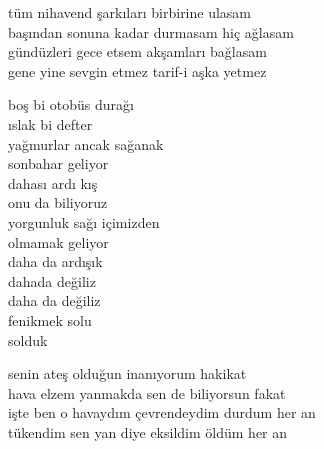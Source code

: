 \documentclass[10pt, openright, oneside]{memoir}
\theoremstyle{definition}
\begin{document}
\vspace*{\fill}
%
\newpage
{}
\vspace*{\fill}
\settowidth{\versewidth}{başından sonuna kadar durmasam hiç ağlasam}
\begin{cverse}
  tüm nihavend şarkıları birbirine ulasam \\
  başından sonuna kadar durmasam hiç ağlasam \\
  gündüzleri gece etsem akşamları bağlasam \\
  gene yine sevgin etmez tarif-i aşka yetmez \\
\end{cverse}
\vspace*{\fill}
%
\newpage
{}
\vspace*{\fill}
\settowidth{\versewidth}{yorgunluk sağı içimizden}
\begin{cverse}
  boş bi otobüs durağı \\
  ıslak bi defter \\
  yağmurlar ancak sağanak \\
  sonbahar geliyor \\
  dahası ardı kış \\
  onu da biliyoruz \\
  yorgunluk sağı içimizden \\
  olmamak geliyor \\
  daha da ardışık \\
  dahada değiliz \\
  daha da değiliz \\
  fenikmek solu \\
  solduk \\
\end{cverse}
\vspace*{\fill}
%
\newpage
{}
\vspace*{\fill}
\settowidth{\versewidth}{işte ben o havaydım çevrendeydim durdum her an}
\begin{cverse}
  senin ateş olduğun inanıyorum hakikat \\
  hava elzem yanmakda sen de biliyorsun fakat \\
  işte ben o havaydım çevrendeydim durdum her an \\
  tükendim sen yan diye eksildim öldüm her an \\
\end{cverse}
\vspace*{\fill}
\end{document}
